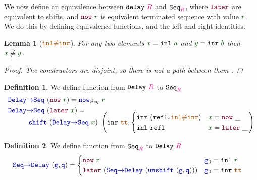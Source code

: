 \documentclass[twoside,11pt,openright]{report}
\theoremstyle{plain} %
\newtheorem{lem}[thm]{Lemma}
\theoremstyle{definition}
\newtheorem{defn}{Definition}[section]
\theoremstyle{remark}
\newcommand*{\term}[1]{\textcolor{green!30!black}{#1}} %
\newcommand*{\type}[1]{\textcolor{magenta!90!black}{#1}}
\newcommand*{\constant}[1]{\textcolor{orange!60!black}{\ensuremath{\mathtt{#1}}}}
\newcommand*{\function}[1]{\textcolor{blue!60!black}{\ensuremath{\mathtt{#1}}}}
\newcommand*{\constructor}[1]{\textcolor{purple!60!black}{\ensuremath{\mathtt{#1}}}}
\newcommand*{\typeformer}[1]{\ensuremath{\mathtt{#1}}}
\begin{document}
\noindent We now define an equivalence between \(\typeformer{delay}~\type{R}\) and \(\typeformer{Seq}_{\type{R}}\), where \(\constructor{later}\) are equivalent to shifts, and \(\constructor{now}~\term{r}\) is equivalent terminated sequence with value \(\term{r}\). We do this by defining equivalence functions, and the left and right identities.
\begin{lem}[\(\constant{inl{\not\equiv}inr}\)]
  For any two elements \(\term{x} = \mathtt{inl}~\term{a}\) and \(\term{y} = \mathtt{inr}~\term{b}\) then \(\term{x} \not\equiv \term{y}\).
  \begin{proof}
    The constructors are disjoint, so there is not a path between them .
  \end{proof}
\end{lem}
\begin{defn}
  We define function from \(\typeformer{Delay}~\type{R}\) to \(\typeformer{Seq}_{\type{R}}\)
  \begin{equation}
    \begin{aligned}
      \function{Delay{\rightarrow}Seq}&~(\constructor{now}~\term{r}) = \function{now}_{Seq}~\term{r} \\
      \function{Delay{\rightarrow}Seq}&~(\constructor{later}~\term{x}) = \\[-3mm]
      & \strut\hspace{-8mm}\function{shift}~(\function{Delay{\rightarrow}Seq}~\term{x})~\left(\mathtt{inr}~\constant{tt} , \begin{cases} \mathtt{inr}~(\mathtt{refl} , \constant{inl{\not\equiv}inr}) & \term{x} = \constructor{now}~\_ \\ \mathtt{inl}~\mathtt{refl} & \term{x} = \constructor{later}~\_ \end{cases}\right)
    \end{aligned}
  \end{equation}
\end{defn}
\begin{defn}
  We define function from \(\typeformer{Seq}_{\type{R}}\) to \(\typeformer{Delay}~\type{R}\)
    \begin{equation}
      \begin{aligned}
        \function{Seq{\rightarrow}Delay}&~(\function{g} , \function{q}) = \begin{cases} \constructor{now}~\term{r} & \function{g}_0 = \mathtt{inl}~\term{r} \\ \constructor{later}~(\function{Seq{\rightarrow}Delay}~(\function{unshift}~(\function{g} , \function{q}))) & \function{g}_0 = \mathtt{inr}~\constant{tt} \end{cases}
      \end{aligned}
    \end{equation}
\end{defn}
\end{document}
